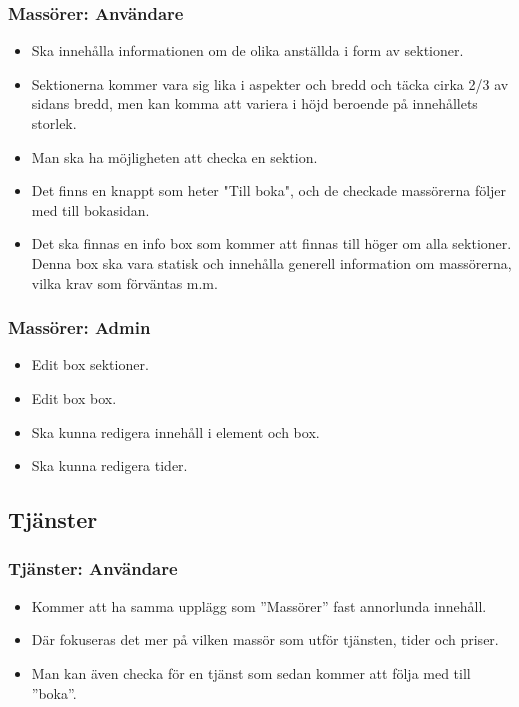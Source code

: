 \documentclass[11pt, titlepage, oneside, a4paper]{article}	%
\begin{document}
	\subsubsection*{Massörer: Användare}
	\begin{itemize}
		\item Ska innehålla informationen om de olika anställda i form av sektioner.
		\item Sektionerna kommer vara sig lika i aspekter och bredd och täcka cirka 2/3 av sidans bredd, men kan komma att variera i höjd beroende på innehållets storlek.
		\item Man ska ha möjligheten att checka en sektion.
		\item Det finns en knappt som heter "Till boka", och de checkade massörerna följer med till bokasidan. 
		\item Det ska finnas en info box som kommer att finnas till höger om alla sektioner. Denna box ska vara statisk och innehålla generell information om massörerna, vilka krav som förväntas m.m. 
	\end{itemize}
	
	\subsubsection*{Massörer: Admin}
	\begin{itemize}
		\item Edit box sektioner.
		\item Edit box box.
		\item Ska kunna redigera innehåll i element och box.
		\item Ska kunna redigera tider.
	\end{itemize} 

\subsection{Tjänster}
	\subsubsection*{Tjänster: Användare}
	\begin{itemize}
		\item Kommer att ha samma upplägg som ”Massörer” fast annorlunda innehåll.
		\item Där fokuseras det mer på vilken massör som utför tjänsten, tider och priser. 
		\item Man kan även checka för en tjänst som sedan kommer att följa med till ”boka”. 
	\end{itemize}
	
\end{document}
